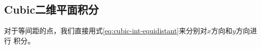 \subsection{Cubic二维平面积分}
对于等间距的点，我们直接用式\eqref{eq:cubic-int-equidistant}来分别对$x$方向和$y$方向进行
积分。










